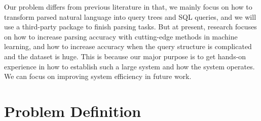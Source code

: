 \documentclass[twocolumn]{article}
\begin{document}
\begin{itemize}
	Our problem differs from previous literature in that, we mainly focus on how to transform parsed natural language into query trees and SQL queries, and we will use a third-party package to finish parsing tasks. But at present, research focuses on how to increase parsing accuracy with cutting-edge methods in machine learning, and how to increase accuracy when the query structure is complicated and the dataset is huge. This is because our major purpose is to get hands-on experience in how to establish such a large system and how the system operates. We can focus on improving system efficiency in future work.\\
\end{itemize}

\section{Problem Definition}
\end{document}
